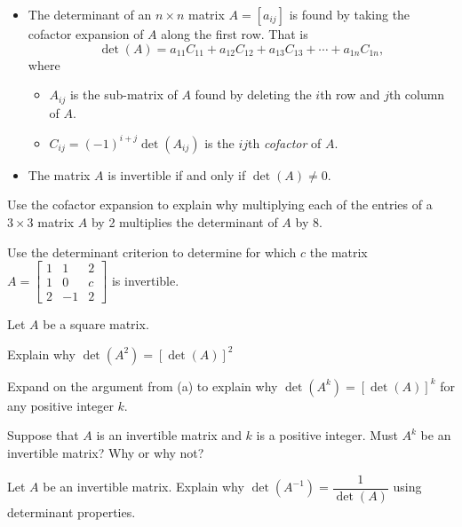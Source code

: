 \begin{itemize}
\item The determinant of an $n \times n$ matrix $A = [a_{ij}]$ is found by taking the cofactor expansion of $A$ along the first row. That is
\[\det(A) = a_{11}C_{11} + a_{12}C_{12} + a_{13}C_{13} + \cdots + a_{1n}C_{1n},\]
where
    \begin{itemize}
    \item $A_{ij}$ is the sub-matrix of $A$ found by deleting the $i$th row and $j$th column of $A$.
    \item $C_{ij} = (-1)^{i+j} \det\left(A_{ij}\right)$ is the $ij$th \emph{cofactor} of $A$.
    \end{itemize}
\item The matrix $A$ is invertible if and only if $\det(A) \neq 0$.


\end{itemize}




\be
\item Use the cofactor expansion to explain why multiplying each of the entries of a $3\times 3$ matrix $A$ by 2 multiplies the determinant of $A$ by 8.

\item Use the determinant criterion to determine for which $c$ the matrix $A=\left[ \begin{array}{crc} 1& 1& 2\\ 1& 0&c\\ 2&-1&2 \end{array} \right]$ is invertible.

\item Let $A$ be a square matrix.
	\ba
	\item Explain why $\det(A^2) = [\det(A)]^2$	
	\item Expand on the argument from (a) to explain why $\det(A^k) = [\det(A)]^k$ for any positive integer $k$.
	\item Suppose that $A$ is an invertible matrix and $k$ is a positive integer. Must $A^k$ be an invertible matrix? Why or why not? 
	
	\ea

	
\item Let $A$ be an invertible matrix. Explain why $\det(A^{-1})= \dfrac{1}{\det(A)}$ using determinant properties.

